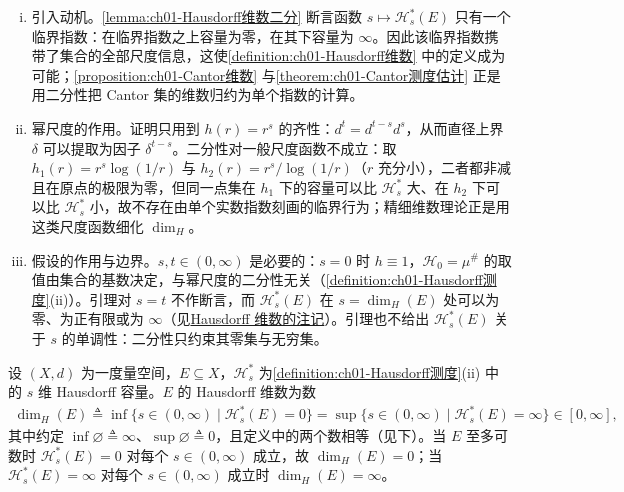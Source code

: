 \documentclass[../../main.tex]{subfiles}%
\begin{document}
\begin{remark}\label{remark:ch01-Hausdorff维数二分}
\begin{enumerate}[(i)]
\item 引入动机。\cref{lemma:ch01-Hausdorff维数二分} 断言函数 $s\mapsto\mathcal{H}_s^*(E)$ 只有一个临界指数：在临界指数之上容量为零，在其下容量为 $\infty$。因此该临界指数携带了集合的全部尺度信息，这使\cref{definition:ch01-Hausdorff维数} 中的定义成为可能；\cref{proposition:ch01-Cantor维数} 与\cref{theorem:ch01-Cantor测度估计} 正是用二分性把 Cantor 集的维数归约为单个指数的计算。
\item 幂尺度的作用。证明只用到 $h(r)=r^s$ 的齐性：$d^t=d^{t-s}d^s$，从而直径上界 $\delta$ 可以提取为因子 $\delta^{t-s}$。二分性对一般尺度函数不成立：取 $h_1(r)=r^s\log(1/r)$ 与 $h_2(r)=r^s/\log(1/r)$（$r$ 充分小），二者都非减且在原点的极限为零，但同一点集在 $h_1$ 下的容量可以比 $\mathcal{H}_s^*$ 大、在 $h_2$ 下可以比 $\mathcal{H}_s^*$ 小，故不存在由单个实数指数刻画的临界行为；精细维数理论正是用这类尺度函数细化 $\dim_H$。
\item 假设的作用与边界。$s,t\in(0,\infty)$ 是必要的：$s=0$ 时 $h\equiv1$，$\mathcal{H}_0=\mu^\#$ 的取值由集合的基数决定，与幂尺度的二分性无关（\cref{definition:ch01-Hausdorff测度}(ii)）。引理对 $s=t$ 不作断言，而 $\mathcal{H}_s^*(E)$ 在 $s=\dim_H(E)$ 处可以为零、为正有限或为 $\infty$（见\hyperref[remark:ch01-Hausdorff维数]{Hausdorff 维数的注记}）。引理也不给出 $\mathcal{H}_s^*(E)$ 关于 $s$ 的单调性：二分性只约束其零集与无穷集。
\end{enumerate}
\end{remark}

\begin{definition}[Hausdorff 维数]\label{definition:ch01-Hausdorff维数}
设 $(X,d)$ 为一度量空间，$E\subseteq X$，$\mathcal{H}_s^*$ 为\cref{definition:ch01-Hausdorff测度}(ii) 中的 $s$ 维 Hausdorff 容量。$E$ 的 Hausdorff 维数为数
\begin{align*}
\dim_H(E)\triangleq\inf\{s\in(0,\infty)\mid\mathcal{H}_s^*(E)=0\}=\sup\{s\in(0,\infty)\mid\mathcal{H}_s^*(E)=\infty\}\in[0,\infty],
\end{align*}
其中约定 $\inf\varnothing\triangleq\infty$、$\sup\varnothing\triangleq0$，且定义中的两个数相等（见下）。当 $E$ 至多可数时 $\mathcal{H}_s^*(E)=0$ 对每个 $s\in(0,\infty)$ 成立，故 $\dim_H(E)=0$；当 $\mathcal{H}_s^*(E)=\infty$ 对每个 $s\in(0,\infty)$ 成立时 $\dim_H(E)=\infty$。
\end{definition}
\end{document}
